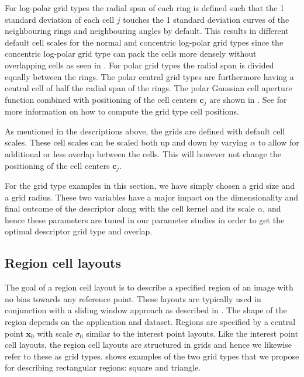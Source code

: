 \documentclass[thesis.tex]{subfiles}
\def\x{\mathbf{x}}
\def\c{\mathbf{c}}
\begin{document}
For log-polar grid types the radial span of each ring is defined such that the 1 standard deviation of each cell $j$ touches the 1 standard deviation curves of the neighbouring rings and neighbouring angles by default. This results in different default cell scales for the normal and concentric log-polar grid types since the concentric log-polar grid type can pack the cells more densely without overlapping cells as seen in .
For polar grid types the radial span is divided equally between the rings. The polar central grid types are furthermore having a central cell of half the radial span of the rings. The polar Gaussian cell aperture function combined with positioning of the cell centers $\c_j$ are shown in .
See  for more information on how to compute the grid type cell positions.

As mentioned in the descriptions above, the grids are defined with default cell scales. These cell scales can be scaled both up and down by varying $\alpha$ to allow for additional or less overlap between the cells. This will however not change the positioning of the cell centers $\c_j$.

For the grid type examples in this section, we have simply chosen a grid size and a grid radius. These two variables have a major impact on the dimensionality and final outcome of the descriptor along with the cell kernel and its scale $\alpha$, and hence these parameters are tuned in our parameter studies in order to get the optimal descriptor grid type and overlap.

\subsection{Region cell layouts}
\label{sec:cellApertureFunctionRegion}

The goal of a region cell layout is to describe a specified region of an image with no bias towards any reference point. These layouts are typically used in conjunction with a sliding window approach as described in . The shape of the region depends on the application and dataset. Regions are specified by a central point $\x_0$ with scale $\sigma_0$ similar to the interest point layouts. Like the interest point cell layouts, the region cell layouts are structured in grids and hence we likewise refer to these as grid types.
 shows examples of the two grid types that we propose for describing rectangular regions: square and triangle.
\end{document}
